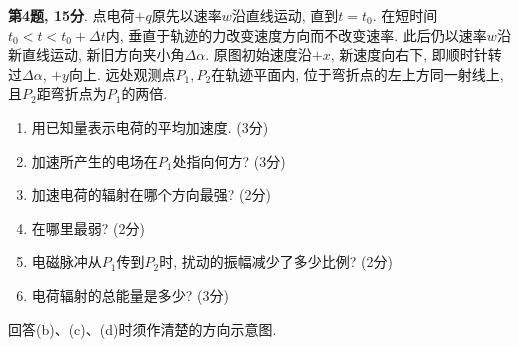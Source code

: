 \begin{exercise}
\textbf{第4题, 15分}. \label{exam:f2.4}
点电荷$+q$原先以速率$w$沿直线运动, 直到$t=t_0$. 在短时间$t_0<t<t_0+\Delta t$内, 垂直于轨迹的力改变速度方向而不改变速率. 此后仍以速率$w$沿新直线运动, 新旧方向夹小角$\Delta\alpha$. 原图初始速度沿$+x$, 新速度向右下, 即顺时针转过$\Delta\alpha$, $+y$向上. 远处观测点$P_1,P_2$在轨迹平面内, 位于弯折点的左上方同一射线上, 且$P_2$距弯折点为$P_1$的两倍.
\begin{enumerate}[label=(\alph*)]
\item 用已知量表示电荷的平均加速度. (3分)
\item 加速所产生的电场在$P_1$处指向何方? (3分)
\item 加速电荷的辐射在哪个方向最强? (2分)
\item 在哪里最弱? (2分)
\item 电磁脉冲从$P_1$传到$P_2$时, 扰动的振幅减少了多少比例? (2分)
\item 电荷辐射的总能量是多少? (3分)
\end{enumerate}
回答(b)、(c)、(d)时须作清楚的方向示意图.
\end{exercise}
